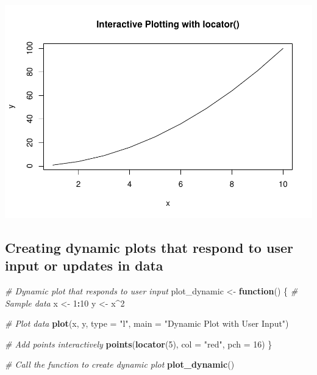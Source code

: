 \documentclass[
]{book}
\newenvironment{Shaded}{\begin{snugshade}}{\end{snugshade}}
\newcommand{\AttributeTok}[1]{\textcolor[rgb]{0.13,0.29,0.53}{#1}}
\newcommand{\CommentTok}[1]{\textcolor[rgb]{0.56,0.35,0.01}{\textit{#1}}}
\newcommand{\ControlFlowTok}[1]{\textcolor[rgb]{0.13,0.29,0.53}{\textbf{#1}}}
\newcommand{\DecValTok}[1]{\textcolor[rgb]{0.00,0.00,0.81}{#1}}
\newcommand{\FunctionTok}[1]{\textcolor[rgb]{0.13,0.29,0.53}{\textbf{#1}}}
\newcommand{\NormalTok}[1]{#1}
\newcommand{\OtherTok}[1]{\textcolor[rgb]{0.56,0.35,0.01}{#1}}
\newcommand{\SpecialCharTok}[1]{\textcolor[rgb]{0.81,0.36,0.00}{\textbf{#1}}}
\newcommand{\StringTok}[1]{\textcolor[rgb]{0.31,0.60,0.02}{#1}}
\begin{document}
\includegraphics{_main_files/figure-latex/unnamed-chunk-55-1.pdf}

\subsection{Creating dynamic plots that respond to user input or updates in data}\label{creating-dynamic-plots-that-respond-to-user-input-or-updates-in-data}

\begin{Shaded}
\begin{Highlighting}[]
\CommentTok{\# Dynamic plot that responds to user input}
\NormalTok{plot\_dynamic }\OtherTok{\textless{}{-}} \ControlFlowTok{function}\NormalTok{() \{}
  \CommentTok{\# Sample data}
\NormalTok{  x }\OtherTok{\textless{}{-}} \DecValTok{1}\SpecialCharTok{:}\DecValTok{10}
\NormalTok{  y }\OtherTok{\textless{}{-}}\NormalTok{ x}\SpecialCharTok{\^{}}\DecValTok{2}
  
  \CommentTok{\# Plot data}
  \FunctionTok{plot}\NormalTok{(x, y, }\AttributeTok{type =} \StringTok{"l"}\NormalTok{, }\AttributeTok{main =} \StringTok{"Dynamic Plot with User Input"}\NormalTok{)}
  
  \CommentTok{\# Add points interactively}
  \FunctionTok{points}\NormalTok{(}\FunctionTok{locator}\NormalTok{(}\DecValTok{5}\NormalTok{), }\AttributeTok{col =} \StringTok{"red"}\NormalTok{, }\AttributeTok{pch =} \DecValTok{16}\NormalTok{)}
\NormalTok{\}}

\CommentTok{\# Call the function to create dynamic plot}
\FunctionTok{plot\_dynamic}\NormalTok{()}
\end{Highlighting}
\end{Shaded}
\end{document}

